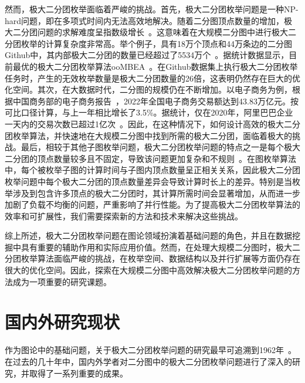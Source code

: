 然而，极大二分团枚举面临着严峻的挑战。首先，极大二分团枚举问题是一种NP-hard问题，即在多项式时间内无法高效地解决。随着二分图顶点数量的增加，极大二分团问题的求解难度呈指数级增长~\cite{MICA04}。这意味着在大规模二分图中进行极大二分团枚举的计算复杂度非常高。举个例子，具有18万个顶点和44万条边的二分图Github中，其内部极大二分团的数量已经超过了5534万个~\cite{konect}。据统计数据显示，目前最优的极大二分团枚举算法ooMBEA~\cite{ooMBE22}。在Github数据集上执行极大二分团枚举任务时，产生的无效枚举数量是极大二分团数量的26倍，这表明仍然存在巨大的优化空间。其次，在大数据时代，二分图的规模仍在不断增加。以电子商务为例，根据中国商务部的电子商务报告~\cite{ECommerceReport}，2022年全国电子商务交易额达到43.83万亿元。按可比口径计算，与上一年相比增长了3.5\%。据统计，仅在2020年，阿里巴巴企业一天内的交易次数已超过1亿次~\cite{MEB20}。因此，在这种情况下，如何设计高效的极大二分团枚举算法，并快速地在大规模二分图中找到所需的极大二分团，面临着极大的挑战。最后，相较于其他子图枚举问题，极大二分团枚举问题的特点之一是每个极大二分团的顶点数量较多且不固定，导致该问题更加复杂和不规则~\cite{Irregularity12}。在图枚举算法中，每个被枚举子图的计算时间与子图内顶点数量呈正相关关系，因此极大二分团枚举问题中每个极大二分团的顶点数量差异会导致计算时长上的差异。特别是当枚举涉及到包含许多顶点的极大二分团时，其计算所需时间会显著增加，从而进一步加剧了负载不均衡的问题，严重影响了并行性能。为了提高极大二分团枚举算法的效率和可扩展性，我们需要探索新的方法和技术来解决这些挑战。

综上所述，极大二分团枚举问题在图论领域扮演着基础问题的角色，并且在数据挖掘中具有重要的辅助作用和实际应用价值。然而，在处理大规模二分图时，极大二分团枚举算法面临严峻的挑战，在枚举空间、数据结构以及并行扩展等方面仍存在很大的优化空间。因此，探索在大规模二分图中高效解决极大二分团枚举问题的方法成为一项重要的研究课题。

\section{国内外研究现状}
\label{sec:related}

作为图论中的基础问题，关于极大二分团枚举问题的研究最早可追溯到1962年~\cite{MBE62}。在过去的几十年中，国内外学者对二分图中的极大二分团枚举问题进行了深入的研究，并取得了一系列重要的成果。

